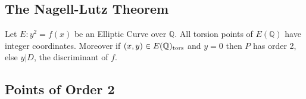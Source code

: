 \subsection{The Nagell-Lutz Theorem}%
\label{sub:the_nagell_lutz_theorem}
\begin{theorem} \label{thm:nagellLutz}
  Let $E: y^2 = f(x)$ be an Elliptic Curve over $\mathbb{Q}$.
  All torsion points of $E(\mathbb{Q})$ have integer coordinates.
  Moreover if $(x,y) \in E(\mathbb{Q})_{\operatorname{tors}}$
  and $y = 0$ then $P$ has order 2, else $y|D$,
  the discriminant of $f$.
\end{theorem}

\subsection{Points of Order 2}%
\label{sub:points_of_order_2}

